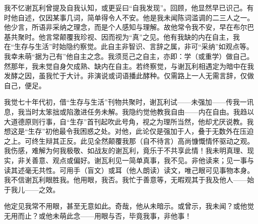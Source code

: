 我不忆谢瓦利曾提及自我认知，或更妥曰“自我发现”。回顾，他显然早已识己。有时他自述，仅因某事几词，简单得令人不安。他是我未闻陈词滥调的二三人之一。他少言，所语非采纳之理念，而是个人感知与理解。故他常令我不安，早在布尔巴基共聚时。他言常颠覆我珍视、因而视为“真”之见。他有我缺的内在自主，我在“生存与生活”时始隐约察觉。此自主非智识、言辞之属，非可“采纳”如观点等。我幸未萌“据为己有”他自主之念。我须觅己之自主，亦即：学（或重学）做自己。然那年，我未觉自身欠成熟、缺内在自主。若终察觉，与谢瓦利相遇定为暗中在我发酵之因，虽我忙于大计。非演说或词语播此酵种。仅需路上一人无需言辞，仅做自己，便足。

我觉七十年代初，借“生存与生活”刊物共聚时，谢瓦利试——未强加——传我一讯息，我当时太笨拙或陷激进任务未解。我隐约觉他教我自由——内在自由。我趋以大道德原则行事，自“生存”首刊起吹此号角，视之为理所当然，他却尤厌说教。我想这是“生存”初他最令我困惑之处。对他，此论仅是强加于人，叠于无数外在压迫之上。可终生辩其正反。此见全然颠覆我那（自不待言）高尚慷慨情怀驱动之观。我伤感，难解为何我极敬、如战友的谢瓦利，竟乐于不共享此情！我未明真理、现实，非关善意、观点或偏好。谢瓦利见一简单真事，我不见。非他读来；见一事与读其述毫无共性。可用手（盲文）或耳（他人朗读）读文，唯己眼可见事物本身。我不信谢瓦利眼胜我。他用眼，我否。我忙于善意等，无暇观其于我及他人——始于我儿——之效。

他定见我常不用眼，甚至无意如此。奇哉，他从未暗示。或曾示，我未闻？或他觉无用而止？或他未萌此念——用眼与否，毕竟我事，非他事！